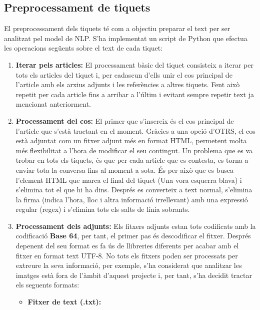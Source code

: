 \subsection{Preprocessament de tiquets}
El preprocessament dels tiquets té com a objectiu preparar el text per ser analitzat pel model de NLP. S'ha implementat un script de Python que efectua les operacions següents sobre el text de cada tiquet:
\begin{enumerate}
     \item \textbf{Iterar pels articles:} El processament bàsic del tiquet consisteix a iterar per tots els articles del tiquet i, per cadascun d'ells unir el cos principal de l'article amb els arxius adjunts i les referències a altres tiquets. Fent això repetit per cada article fins a arribar a l'últim i evitant sempre repetir text ja mencionat anteriorment.
     \item \textbf{Processament del cos:} El primer que s'insereix és el cos principal de l'article que s'està tractant en el moment. Gràcies a una opció d'OTRS, el cos està adjuntat com un fitxer adjunt més en format HTML, permetent molta més flexibilitat a l'hora de modificar el seu contingut. Un problema que es va trobar en tots els tiquets, és que per cada article que es contesta, es torna a enviar tota la conversa fins al moment a sota. És per això que es busca l'element HTML que marca el final del tiquet (Una vora esquerra blava) i s'elimina tot el que hi ha dins. Després es converteix a text normal, s'elimina la firma (indica l'hora, lloc i altra informació irrellevant) amb una expressió regular (regex) i s'elimina tots els salts de línia sobrants.
     \item \textbf{Processament dels adjunts:} Els fitxers adjunts estan tots codificats amb la codificació \textbf{Base 64}, per tant, el primer pas és descodificar el fitxer. Després depenent del seu format es fa ús de llibreries diferents per acabar amb el fitxer en format text UTF-8. No tots els fitxers poden ser processats per extreure la seva informació, per exemple, s'ha considerat que analitzar les imatges està fora de l'àmbit d'aquest projecte i, per tant, s'ha decidit tractar els seguents formats:
          \begin{itemize}
               \item \textbf{Fitxer de text (.txt):}

\end{itemize}
\end{enumerate}
